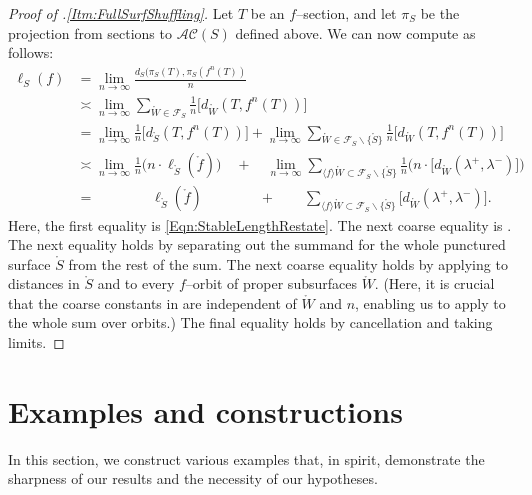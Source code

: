 \documentclass[11pt,letterpaper]{amsart}
\newcommand{\mc}{\mathcal}
\newcommand{\mr}{\mathring}
\newcommand{\psub}{\mr W}
\numberwithin{equation}{section}
\theoremstyle{definition}
\renewcommand{\setminus}{\smallsetminus}
\newcommand{\AC}{\mathcal{AC}}
\begin{document}
\begin{proof}[Proof of .\eqref{Itm:FullSurfShuffling}]
Let $T$ be an $f$--section, and let $\pi_S$ be the projection from sections to $\AC(S)$ defined above. We can now compute as follows:
\begin{align*}
\ell_S(f) &= \lim_{n \to \infty} \frac{ d_S ( \pi_S(T), \pi_S(f^n(T)) }{n} \\
&\asymp \lim_{n \to \infty}  \sum_{\psub \in \mc F_S} \frac{1}{n} \big[ d_{\psub}(T, f^n(T)) \big]  \\
& = \lim_{n \to \infty} \frac{1}{n} \big[ d_{\mr S}(T, f^n(T)) \big]  + \lim_{n \to \infty} \sum_{\psub \in \mc F_S \setminus \{ \mr S \}} \frac{1}{n} \big[ d_{\psub}(T, f^n(T)) \big] \\
& \asymp  \lim_{n \to \infty} \frac{1}{n} \big( n \cdot \ell_{\mr S}(\mr f) \big) \quad + \quad
 \lim_{n \to \infty}  \sum_{\langle f \rangle \psub \subset \mc F_S \setminus \{ \mr S \}} \frac{1}{n}
 \Big(  n \cdot \big[ d_{\psub}(\lambda^+, \lambda^-) \big] \Big) \\
 & = \qquad \qquad \ell_{\mr S}(\mr f) \qquad \qquad + \qquad \sum_{\langle f \rangle \psub \subset \mc F_S \setminus \{\mr S\}} \big[ d_{\psub}(\lambda^+,\lambda^-) \big].
\end{align*}
Here, the first equality is \eqref{Eqn:StableLengthRestate}. The next coarse equality is . The next equality holds by separating out the summand for the whole punctured surface $\mr S$ from the rest of the sum. The next coarse equality holds by applying  to distances in $\mr S$ and  to every $f$--orbit of proper subsurfaces $\psub$. 
(Here, it is crucial that the coarse constants in   are independent of $\psub$ and $n$, enabling us to apply  to the whole sum over orbits.)
The final equality holds by cancellation and taking limits.
\end{proof}



\section{Examples and constructions} \label{Sec:Examples}\label{sec:FPF}

In this section, we construct various examples that, in spirit, demonstrate the sharpness of our results and the necessity of our hypotheses. 

\end{document}
